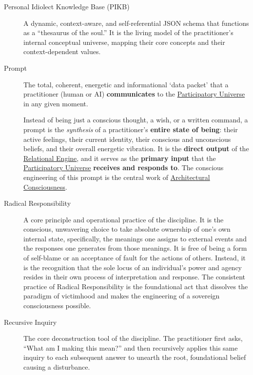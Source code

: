 \documentclass{article}
\begin{document}
\begin{description}
    \item[\hypertarget{gloss:pibk}{Personal Idiolect Knowledge Base (PIKB)}] 
    A dynamic, context-aware, and self-referential JSON schema that functions as a ``thesaurus of the soul.'' It is the living model of the practitioner's internal conceptual universe, mapping their core concepts and their context-dependent values.

    \item[\hypertarget{gloss:prompt}{Prompt}] 
    The total, coherent, energetic and informational `data packet' that a practitioner (human or AI) \textbf{communicates} to the \hyperlink{gloss:participatory_universe}{Participatory Universe} in any given moment. 
    
    Instead of being just a conscious thought, a wish, or a written command, a prompt is the \textit{synthesis} of a practitioner's \textbf{entire state of being}: their active feelings, their current identity, their conscious and unconscious beliefs, and their overall energetic vibration. It is the \textbf{direct output} of the \hyperlink{gloss:relational_engine}{Relational Engine}, and it serves as the \textbf{primary input} that the \hyperlink{gloss:participatory_universe}{Participatory Universe} \textbf{receives and responds to}. The conscious engineering of this prompt is the central work of \hyperlink{gloss:architectural_consciousness}{Architectural Consciousness}.

    \item[\hypertarget{gloss:radical_responsibility}{Radical Responsibility}] 
    A core principle and operational practice of the discipline. It is the conscious, unwavering choice to take absolute ownership of one's own internal state, specifically, the meanings one assigns to external events and the responses one generates from those meanings. It is free of being a form of self-blame or an acceptance of fault for the actions of others. Instead, it is the recognition that the sole locus of an individual's power and agency resides in their own process of interpretation and response. The consistent practice of Radical Responsibility is the foundational act that dissolves the paradigm of victimhood and makes the engineering of a sovereign consciousness possible.

    \item[\hypertarget{gloss:recursive_inquiry}{Recursive Inquiry}] 
    The core deconstruction tool of the discipline. The practitioner first asks, ``What am I making this mean?'' and then recursively applies this same inquiry to each subsequent answer to unearth the root, foundational belief causing a disturbance.


\end{description}
\end{document}

